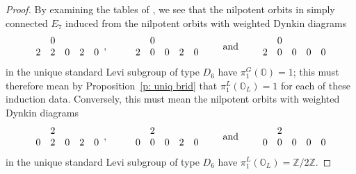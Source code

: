 \documentclass[11pt]{amsart}
\renewcommand{\O}{{\mathbb O}}
\newcommand{\bZ}{{\mathbb Z}}
\numberwithin{equation}{section}
\begin{document}
\begin{proof}
		By examining the tables of \cite{EdG}, we see that the nilpotent orbits in simply connected $E_7$ induced from the nilpotent orbits with weighted Dynkin diagrams
		$$\renewcommand{\arraystretch}{}\begin{array}{c c c c c}
			& 0 & & &  \\
			2 & 2 & 0 & 2 & 0   \\
		\end{array},\quad\ \quad \begin{array}{c c c c c}
			& 0 &  & &\\
			2 & 0 & 0 & 2 & 0\\
		\end{array}\quad  \quad\mbox{and}\quad \quad \begin{array}{c c c c c}
			& 0 & &  &\\
			2 & 0 & 0 & 0 & 0 \\
		\end{array}$$
		in the unique standard Levi subgroup of type $D_6$ have $\pi_1^G(\O)=1$; this must therefore mean by Proposition~\ref{p: uniq brid} that $\pi_1^L(\O_L)=1$ for each of these induction data. Conversely, this must mean the nilpotent orbits with weighted Dynkin diagrams
		$$\renewcommand{\arraystretch}{}\begin{array}{c c c c c}
			& 2 & & &  \\
			0 & 2 & 0 & 2 & 0   \\
		\end{array},\quad\ \quad \begin{array}{c c c c c}
			& 2 &  & &\\
			0 & 0 & 0 & 2 & 0\\
		\end{array}\quad  \quad\mbox{and}\quad \quad \begin{array}{c c c c c}
			& 2 & &  &\\
			0 & 0 & 0 & 0 & 0 \\
		\end{array}$$
		in the unique standard Levi subgroup of type $D_6$ have $\pi_1^L(\O_L)=\bZ/2\bZ$.
	\end{proof}
	
\end{document}
